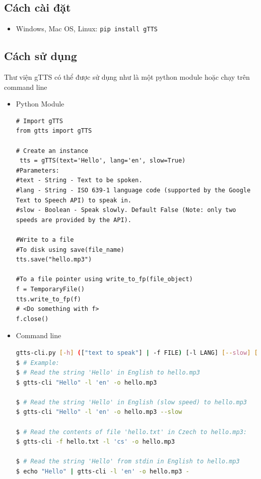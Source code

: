 \subsection{Cách cài đặt}
\begin{itemize}
\item Windows, Mac OS, Linux: \lstinline[language=bash]{pip install gTTS}
\end{itemize}

\subsection{Cách sử dụng}
Thư viện gTTS có thể được sử dụng như là một python module hoặc chạy trên command line
\begin{itemize}
\item Python Module
\begin{lstlisting}
# Import gTTS
from gtts import gTTS

# Create an instance
 tts = gTTS(text='Hello', lang='en', slow=True)
#Parameters:
#text - String - Text to be spoken.
#lang - String - ISO 639-1 language code (supported by the Google Text to Speech API) to speak in.
#slow - Boolean - Speak slowly. Default False (Note: only two speeds are provided by the API).

#Write to a file
#To disk using save(file_name)
tts.save("hello.mp3")

#To a file pointer using write_to_fp(file_object)
f = TemporaryFile()
tts.write_to_fp(f)
# <Do something with f>
f.close()
\end{lstlisting}
\item Command line
\begin{lstlisting}[language=bash]
gtts-cli.py [-h] (["text to speak"] | -f FILE) [-l LANG] [--slow] [--debug] [-o destination_file]
$ # Example:
$ # Read the string 'Hello' in English to hello.mp3
$ gtts-cli "Hello" -l 'en' -o hello.mp3

$ # Read the string 'Hello' in English (slow speed) to hello.mp3
$ gtts-cli "Hello" -l 'en' -o hello.mp3 --slow

$ # Read the contents of file 'hello.txt' in Czech to hello.mp3:
$ gtts-cli -f hello.txt -l 'cs' -o hello.mp3

$ # Read the string 'Hello' from stdin in English to hello.mp3
$ echo "Hello" | gtts-cli -l 'en' -o hello.mp3 -
\end{lstlisting}
\end{itemize}

